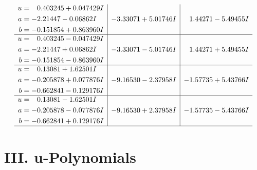 \documentclass[1p]{elsarticle_modified}
\theoremstyle{definition}
\begin{document}
$$\begin{array}{c|c|c}
\begin{aligned}
u &= \phantom{-}0.403245 + 0.047429 I \\
a &= -2.21447 - 0.06862 I \\
b &= -0.151854 + 0.863960 I\end{aligned}
 & -3.33071 + 5.01746 I & \phantom{-}1.44271 - 5.49455 I \\ \hline\begin{aligned}
u &= \phantom{-}0.403245 - 0.047429 I \\
a &= -2.21447 + 0.06862 I \\
b &= -0.151854 - 0.863960 I\end{aligned}
 & -3.33071 - 5.01746 I & \phantom{-}1.44271 + 5.49455 I \\ \hline\begin{aligned}
u &= \phantom{-}0.13081 + 1.62501 I \\
a &= -0.205878 + 0.077876 I \\
b &= -0.662841 - 0.129176 I\end{aligned}
 & -9.16530 - 2.37958 I & -1.57735 + 5.43766 I \\ \hline\begin{aligned}
u &= \phantom{-}0.13081 - 1.62501 I \\
a &= -0.205878 - 0.077876 I \\
b &= -0.662841 + 0.129176 I\end{aligned}
 & -9.16530 + 2.37958 I & -1.57735 - 5.43766 I\\
 \hline 
 \end{array}$$\newpage
\newpage\renewcommand{\arraystretch}{1}
\centering \section*{ III. u-Polynomials}
\end{document}
